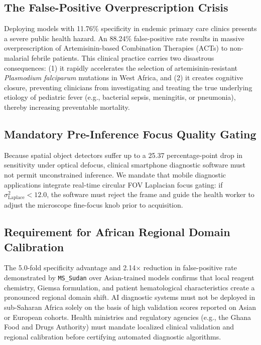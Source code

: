 \documentclass[10pt,journal,compsoc]{IEEEtran}
\begin{document}
\subsection{The False-Positive Overprescription Crisis}
Deploying models with 11.76\% specificity in endemic primary care clinics presents a severe public health hazard. An 88.24\% false-positive rate results in massive overprescription of Artemisinin-based Combination Therapies (ACTs) to non-malarial febrile patients. This clinical practice carries two disastrous consequences: (1) it rapidly accelerates the selection of artemisinin-resistant \textit{Plasmodium falciparum} mutations in West Africa, and (2) it creates cognitive closure, preventing clinicians from investigating and treating the true underlying etiology of pediatric fever (e.g., bacterial sepsis, meningitis, or pneumonia), thereby increasing preventable mortality.

\subsection{Mandatory Pre-Inference Focus Quality Gating}
Because spatial object detectors suffer up to a 25.37 percentage-point drop in sensitivity under optical defocus, clinical smartphone diagnostic software must not permit unconstrained inference. We mandate that mobile diagnostic applications integrate real-time circular FOV Laplacian focus gating: if $\sigma_{\text{Laplace}}^2 < 12.0$, the software must reject the frame and guide the health worker to adjust the microscope fine-focus knob prior to acquisition.

\subsection{Requirement for African Regional Domain Calibration}
The 5.0-fold specificity advantage and 2.14$\times$ reduction in false-positive rate demonstrated by \texttt{MS\_Sudan} over Asian-trained models confirms that local reagent chemistry, Giemsa formulation, and patient hematological characteristics create a pronounced regional domain shift. AI diagnostic systems must not be deployed in sub-Saharan Africa solely on the basis of high validation scores reported on Asian or European cohorts. Health ministries and regulatory agencies (e.g., the Ghana Food and Drugs Authority) must mandate localized clinical validation and regional calibration before certifying automated diagnostic algorithms.
\end{document}
